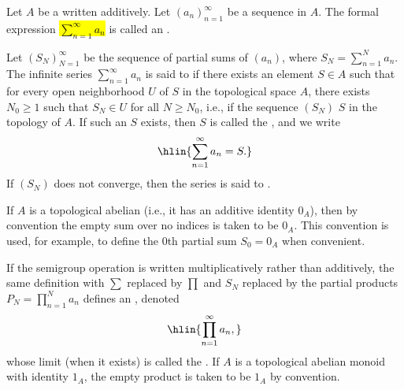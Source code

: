 \begin{definition} \label{definition:infinite_series_and_convergence_of_infinite_series_in_a_topological_abelian_semigroup}
    Let $A$ be a  written additively. Let $(a_n)_{n=1}^\infty$ be a sequence in $A$. The formal expression
    \hl{$\sum_{n=1}^\infty a_n$}
    is called an .

    Let $(S_N)_{N=1}^\infty$ be the sequence of partial sums of $(a_n)$, where $S_N = \sum_{n=1}^N a_n$. The infinite series $\sum_{n=1}^\infty a_n$ is said to  if there exists an element $S \in A$ such that for every open neighborhood $U$ of $S$ in the topological space $A$, there exists $N_0 \geq 1$ such that $S_N \in U$ for all $N \geq N_0$, i.e., if the sequence $(S_N)$  $S$ in the topology of $A$. If such an $S$ exists, then $S$ is called the , and we write
    $$\hlin{\sum_{n=1}^\infty a_n = S.}$$
    If $(S_N)$ does not converge, then the series is said to .

    If $A$ is a topological abelian  (i.e., it has an additive identity $0_A$), then by convention the empty sum over no indices is taken to be $0_A$. This convention is used, for example, to define the $0$th partial sum $S_0 = 0_A$ when convenient.

    If the semigroup operation is written multiplicatively rather than additively, the same definition with $\sum$ replaced by $\prod$ and $S_N$ replaced by the partial products $P_N = \prod_{n=1}^N a_n$ defines an , denoted
    $$\hlin{\prod_{n=1}^\infty a_n,}$$
    whose limit (when it exists) is called the . If $A$ is a topological abelian monoid with identity $1_A$, the empty product is taken to be $1_A$ by convention.

\end{definition}